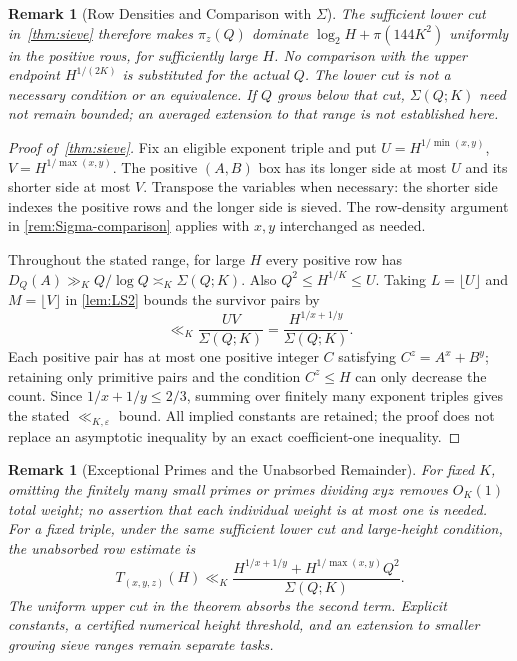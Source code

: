 \documentclass[11pt,a4paper]{article}
\newtheorem{remark}[theorem]{Remark}
\begin{document}
\begin{remark}[Row Densities and Comparison with $\Sigma$]
The sufficient lower cut in~\cref{thm:sieve} therefore makes
$\pi_z(Q)$ dominate $\log_2 H+\pi(144K^2)$ uniformly in the
positive rows, for sufficiently large $H$. No comparison with the
upper endpoint $H^{1/(2K)}$ is substituted for the actual $Q$.
The lower cut is not a necessary condition or an equivalence.
If $Q$ grows below that cut, $\Sigma(Q;K)$ need not remain bounded;
an averaged extension to that range is not established here.
\end{remark}

\begin{proof}[Proof of~\cref{thm:sieve}]
Fix an eligible exponent triple and put
$U=H^{1/\min(x,y)}$, $V=H^{1/\max(x,y)}$.
The positive $(A,B)$ box has its longer side at most $U$ and its
shorter side at most $V$. Transpose the variables when necessary:
the shorter side indexes the positive rows and the longer side
is sieved. The row-density argument in
\cref{rem:Sigma-comparison} applies with $x,y$ interchanged as needed.

Throughout the stated range, for large $H$ every positive row has
$D_Q(A)\gg_K Q/\log Q\asymp_K\Sigma(Q;K)$.
Also $Q^2\le H^{1/K}\le U$.
Taking $L=\lfloor U\rfloor$ and $M=\lfloor V\rfloor$ in
\cref{lem:LS2} bounds the survivor pairs by
\[
 \ll_K\frac{UV}{\Sigma(Q;K)}
       =\frac{H^{1/x+1/y}}{\Sigma(Q;K)}.
\]
Each positive pair has at most one positive integer $C$ satisfying
$C^z=A^x+B^y$; retaining only primitive pairs and the condition
$C^z\le H$ can only decrease the count. Since $1/x+1/y\le2/3$,
summing over finitely many exponent triples gives the stated
$\ll_{K,\varepsilon}$ bound. All implied constants are retained;
the proof does not replace an asymptotic inequality by an exact
coefficient-one inequality.
\end{proof}

\begin{remark}[Exceptional Primes and the Unabsorbed Remainder]
\label{rem:exceptional}
For fixed $K$, omitting the finitely many small primes or primes
dividing $xyz$ removes $O_K(1)$ total weight; no assertion that
each individual weight is at most one is needed.
For a fixed triple, under the same sufficient lower cut and
large-height condition, the unabsorbed row estimate is
\[
 T_{(x,y,z)}(H)\ll_K
 \frac{H^{1/x+1/y}+H^{1/\max(x,y)}Q^2}{\Sigma(Q;K)}.
\]
The uniform upper cut in the theorem absorbs the second term.
Explicit constants, a certified numerical height threshold, and
an extension to smaller growing sieve ranges remain separate tasks.
\end{remark}
\end{document}
